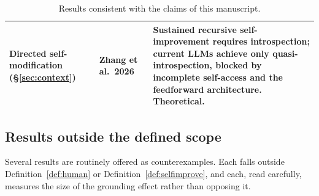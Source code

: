 \documentclass[11pt,a4paper]{article}
\newcommand{\midrule}{\hline}
\newcommand{\bottomrule}{\hline}
\begin{document}
\begin{table}[h]
\begin{tabular}{@{}p{2.6cm}p{5.1cm}p{6.4cm}@{}}
\midrule
Directed self-modification (\S\ref{sec:context}) &
Zhang et al.~2026~\cite{zhang2026introspection} &
Sustained recursive self-improvement requires introspection; current LLMs achieve only quasi-introspection, blocked by incomplete self-access and the feedforward architecture. Theoretical. \\
\bottomrule
\end{tabular}
\caption{Results consistent with the claims of this manuscript.}
\label{tab:support}
\end{table}

\subsection{Results outside the defined scope}

Several results are routinely offered as counterexamples. Each falls outside Definition~\ref{def:human} or Definition~\ref{def:selfimprove}, and each, read carefully, measures the size of the grounding effect rather than opposing it.
\end{document}
